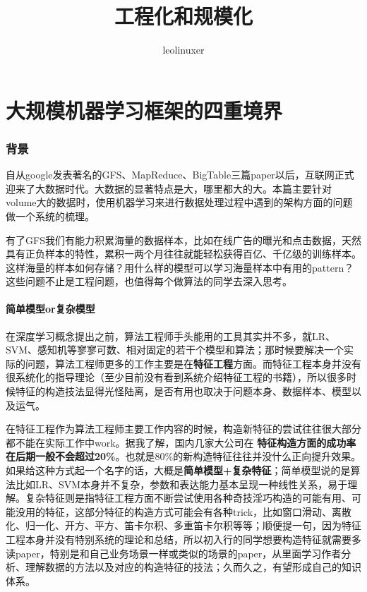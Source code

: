 \documentclass[12pt]{article}
\title{工程化和规模化}
\author{leolinuxer}
\begin{document}
\maketitle
\tableofcontents

\part{大规模机器学习框架的四重境界\cite{Four_Levels_Of_Large_Scale_Machine_Learning}}
\section{背景}
自从google发表著名的GFS、MapReduce、BigTable三篇paper以后，互联网正式迎来了大数据时代。大数据的显著特点是大，哪里都大的大。本篇主要针对volume大的数据时，使用机器学习来进行数据处理过程中遇到的架构方面的问题做一个系统的梳理。

有了GFS我们有能力积累海量的数据样本，比如在线广告的曝光和点击数据，天然具有正负样本的特性，累积一两个月往往就能轻松获得百亿、千亿级的训练样本。这样海量的样本如何存储？用什么样的模型可以学习海量样本中有用的pattern？这些问题不止是工程问题，也值得每个做算法的同学去深入思考。


\subsection{简单模型or复杂模型}
在深度学习概念提出之前，算法工程师手头能用的工具其实并不多，就LR、SVM、感知机等寥寥可数、相对固定的若干个模型和算法；那时候要解决一个实际的问题，算法工程师更多的工作主要是在\textbf{特征工程}方面。而特征工程本身并没有很系统化的指导理论（至少目前没有看到系统介绍特征工程的书籍），所以很多时候特征的构造技法显得光怪陆离，是否有用也取决于问题本身、数据样本、模型以及运气。

在特征工程作为算法工程师主要工作内容的时候，构造新特征的尝试往往很大部分都不能在实际工作中work。据我了解，国内几家大公司在
\textbf{特征构造方面的成功率在后期一般不会超过20\%}。也就是80\%的新构造特征往往并没什么正向提升效果。如果给这种方式起一个名字的话，大概是\textbf{简单模型+复杂特征}；简单模型说的是算法比如LR、SVM本身并不复杂，参数和表达能力基本呈现一种线性关系，易于理解。复杂特征则是指特征工程方面不断尝试使用各种奇技淫巧构造的可能有用、可能没用的特征，这部分特征的构造方式可能会有各种trick，比如窗口滑动、离散化、归一化、开方、平方、笛卡尔积、多重笛卡尔积等等；顺便提一句，因为特征工程本身并没有特别系统的理论和总结，所以初入行的同学想要构造特征就需要多读paper，特别是和自己业务场景一样或类似的场景的paper，从里面学习作者分析、理解数据的方法以及对应的构造特征的技法；久而久之，有望形成自己的知识体系。
\end{document}
